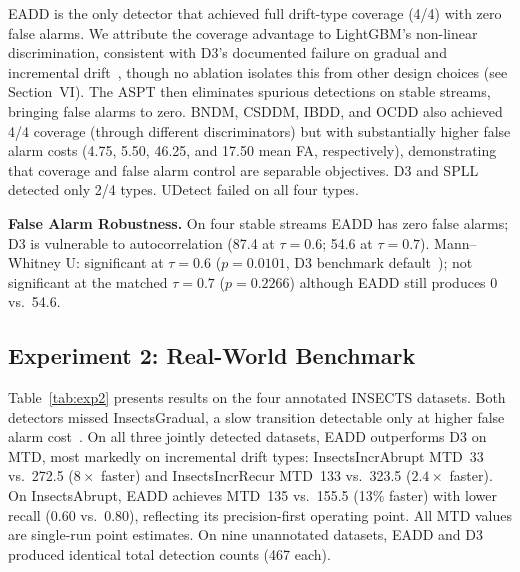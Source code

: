 \documentclass[conference,a4paper]{IEEEtran}
\begin{document}
EADD is the only detector that achieved full drift-type coverage (4/4) with zero false alarms. We attribute the coverage advantage to LightGBM's non-linear discrimination, consistent with D3's documented failure on gradual and incremental drift~\cite{b9,b10}, though no ablation isolates this from other design choices (see Section~VI). The ASPT then eliminates spurious detections on stable streams, bringing false alarms to zero. BNDM, CSDDM, IBDD, and OCDD also achieved 4/4 coverage (through different discriminators) but with substantially higher false alarm costs (4.75, 5.50, 46.25, and 17.50 mean FA, respectively), demonstrating that coverage and false alarm control are separable objectives. D3 and SPLL detected only 2/4 types. UDetect failed on all four types.

\textbf{False Alarm Robustness.} On four stable streams EADD has zero false alarms; D3 is vulnerable to autocorrelation (87.4 at $\tau{=}0.6$; 54.6 at $\tau{=}0.7$). Mann--Whitney U: significant at $\tau{=}0.6$ ($p{=}0.0101$, D3 benchmark default~\cite{b10}); not significant at the matched $\tau{=}0.7$ ($p{=}0.2266$) although EADD still produces 0 vs.\ 54.6.

\subsection{Experiment 2: Real-World Benchmark}

Table~\ref{tab:exp2} presents results on the four annotated INSECTS datasets. Both detectors missed InsectsGradual, a slow transition detectable only at higher false alarm cost~\cite{b10}. On all three jointly detected datasets, EADD outperforms D3 on MTD, most markedly on incremental drift types: InsectsIncrAbrupt MTD~33 vs.\ 272.5 ($8{\times}$ faster) and InsectsIncrRecur MTD~133 vs.\ 323.5 ($2.4{\times}$ faster). On InsectsAbrupt, EADD achieves MTD~135 vs.\ 155.5 (13\% faster) with lower recall (0.60 vs.\ 0.80), reflecting its precision-first operating point. All MTD values are single-run point estimates. On nine unannotated datasets, EADD and D3 produced identical total detection counts (467 each).
\end{document}
